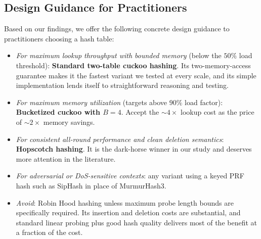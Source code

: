 \documentclass[10pt,journal,compsoc]{IEEEtran}
\begin{document}
\subsection{Design Guidance for Practitioners}
Based on our findings, we offer the following concrete design guidance to practitioners choosing a hash table:

\begin{itemize}
    \item \emph{For maximum lookup throughput with bounded memory} (below the $50\%$ load threshold): \textbf{Standard two-table cuckoo hashing}. Its two-memory-access guarantee makes it the fastest variant we tested at every scale, and its simple implementation lends itself to straightforward reasoning and testing.
    \item \emph{For maximum memory utilization} (targets above $90\%$ load factor): \textbf{Bucketized cuckoo with $B=4$}. Accept the $\sim 4\times$ lookup cost as the price of $\sim 2\times$ memory savings.
    \item \emph{For consistent all-round performance and clean deletion semantics}: \textbf{Hopscotch hashing}. It is the dark-horse winner in our study and deserves more attention in the literature.
    \item \emph{For adversarial or DoS-sensitive contexts}: any variant using a keyed PRF hash such as SipHash in place of MurmurHash3.
    \item \emph{Avoid}: Robin Hood hashing unless maximum probe length bounds are specifically required. Its insertion and deletion costs are substantial, and standard linear probing plus good hash quality delivers most of the benefit at a fraction of the cost.
\end{itemize}



\end{document}
